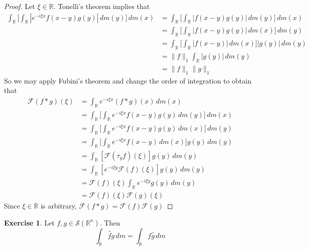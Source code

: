 \documentclass{book}
\theoremstyle{definition}
\newtheorem{ex}[definition]{Exercise}
\newcommand{\R}{\mathbb{R}}
\newcommand{\MF}{\mathcal{F}}
\newcommand{\MS}{\mathcal{S}}
\DeclareMathOperator*{\0}{\mbf{0}}
\DeclareMathOperator*{\1}{\mbf{1}}
\newcommand{\dm}{\, d m}
\begin{document}
	\begin{proof}
		Let $\xi \in \R$. Tonelli's theorem implies that  
		\begin{align*}
			\int_{\R} \bigg[ \int_{\R} | e^{-i\xi x} f(x-y)g(y)| \dm(y) \bigg] \dm(x)
			& = \int_{\R}  \bigg[ \int_{\R}  |f(x-y)g(y) |\dm(y) \bigg] \dm(x) \\
			& = \int_{\R}  \bigg[ \int_{\R}  |f(x-y)g(y) |\dm(x) \bigg] \dm(y) \\
			& = \int_{\R}  \bigg[ \int_{\R}  |f(x-y) |\dm(x) \bigg] |g(y)| \dm(y) \\
			& = \|f\|_1 \int_{\R} |g(y)| \dm(y) \\
			& = \|f\|_1\|g\|_1
		\end{align*}
		So we may apply Fubini's theorem and change the order of integration to obtain that
		\begin{align*}
			\MF(f*g)(\xi)
			& = \int_{\R} e^{-i\xi x} (f*g)(x) \dm(x) \\
			& = \int_{\R}  \bigg[ \int_{\R} e^{-i\xi x} f(x-y)g(y) \dm(y) \bigg] \dm(x) \\
			& = \int_{\R}  \bigg[ \int_{\R} e^{-i\xi x} f(x-y)g(y) \dm(x) \bigg] \dm(y) \\
			& = \int_{\R}  \bigg[ \int_{\R} e^{-i\xi x} f(x-y) \dm(x) \bigg] g(y) \dm(y) \\
			& = \int_{\R}  [\MF(\tau_yf)(\xi) ] g(y) \dm(y) \\
			& = \int_{\R}  [e^{-i \xi y}\MF(f)(\xi) ] g(y) \dm(y) \\
			& = \MF(f)(\xi) \int_{\R}  e^{-i \xi y}  g(y) \dm(y) \\
			& = \MF(f)(\xi) \MF(g)(\xi)
		\end{align*}
		Since $\xi \in \R$ is arbitrary, $\MF(f*g) = \MF(f) \MF(g)$
	\end{proof}

	\begin{ex}
		Let $f,g \in \MS(\R^n)$. Then $$\int_{\R}\hat{f} g \dm = \int_{\R}f \hat{g}  \dm$$
	\end{ex}
	
\end{document}
